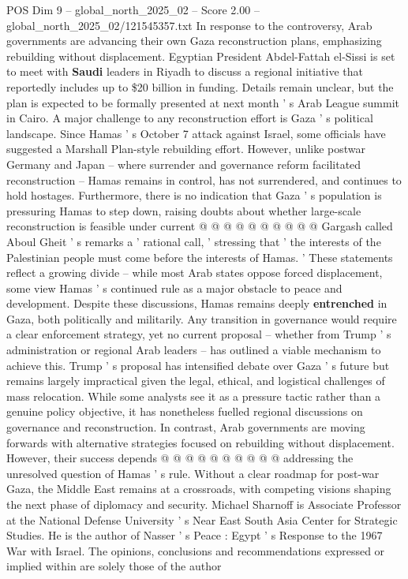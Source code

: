 \begin{textsample}{POS Dim 9 – global\_north\_2025\_02 – Score 2.00 – global\_north\_2025\_02/121545357.txt}
In response to the controversy, Arab governments are advancing their own Gaza reconstruction plans, emphasizing rebuilding without displacement.
Egyptian President Abdel-Fattah el-Sissi is set to meet with \textbf{Saudi} leaders in Riyadh to discuss a regional initiative that reportedly includes up to \$20 billion in funding.
Details remain unclear, but the plan is expected to be formally presented at next month ' s Arab League summit in Cairo.
A major challenge to any reconstruction effort is Gaza ' s political landscape.
Since Hamas ' s October 7 attack against Israel, some officials have suggested a Marshall Plan-style rebuilding effort.
However, unlike postwar Germany and Japan -- where surrender and governance reform facilitated reconstruction -- Hamas remains in control, has not surrendered, and continues to hold hostages.
Furthermore, there is no indication that Gaza ' s population is pressuring Hamas to step down, raising doubts about whether large-scale reconstruction is feasible under current @ @ @ @ @ @ @ @ @ @ Gargash called Aboul Gheit ' s remarks a ' rational call, ' stressing that ' the interests of the Palestinian people must come before the interests of Hamas. ' These statements reflect a growing divide -- while most Arab states oppose forced displacement, some view Hamas ' s continued rule as a major obstacle to peace and development.
Despite these discussions, Hamas remains deeply \textbf{entrenched} in Gaza, both politically and militarily.
Any transition in governance would require a clear enforcement strategy, yet no current proposal -- whether from Trump ' s administration or regional Arab leaders -- has outlined a viable mechanism to achieve this.
Trump ' s proposal has intensified debate over Gaza ' s future but remains largely impractical given the legal, ethical, and logistical challenges of mass relocation.
While some analysts see it as a pressure tactic rather than a genuine policy objective, it has nonetheless fuelled regional discussions on governance and reconstruction.
In contrast, Arab governments are moving forwards with alternative strategies focused on rebuilding without displacement.
However, their success depends @ @ @ @ @ @ @ @ @ @ addressing the unresolved question of Hamas ' s rule.
Without a clear roadmap for post-war Gaza, the Middle East remains at a crossroads, with competing visions shaping the next phase of diplomacy and security.
Michael Sharnoff is Associate Professor at the National Defense University ' s Near East South Asia Center for Strategic Studies.
He is the author of Nasser ' s Peace : Egypt ' s Response to the 1967 War with Israel.
The opinions, conclusions and recommendations expressed or implied within are solely those of the author

\end{textsample}
